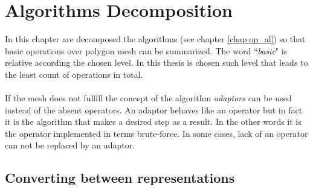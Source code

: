 \chapter{Algorithms Decomposition}

In this chapter are decomposed the algorithms (see chapter \ref{chap:op_al}) so that basic
operations over polygon
mesh can be summarized. The word ``\emph{basic}" is relative according the chosen level.
In this thesis is chosen such level that leads to the least count of operations in total.\\
\\
If the mesh does not fulfill the concept of the algorithm \emph{adaptors} can be used instead
of the absent operators. An adaptor behaves like an operator but in fact it is the algorithm that
makes a desired step as a result. In the other words it is the operator implemented in terms
brute-force. In some cases, lack of an operator can not be replaced by an adaptor.

\section{Converting between representations}